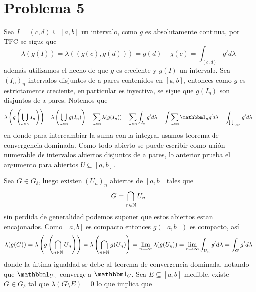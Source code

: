 \documentclass{article}
\begin{document}
\section*{Problema 5}
\noindent Sea $I=(c,d)\subseteq[a,b]$ un intervalo, como $g$ es absolutamente continua, por TFC 
se sigue que
\begin{equation*}
    \lambda(g(I))=\lambda((g(c),g(d)))=g(d)-g(c)=\int_{(c,d)}g'd\lambda
\end{equation*}
además utilizamos el hecho de que $g$ es creciente y $g(I)$ un intervalo.
Sea $(I_{n})_{n}$ intervalos disjuntos de a pares contenidos en $[a,b]$, entonces como $g$ es 
estrictamente creciente, en particular es inyectiva, se sigue que $g(I_{n})$ son disjuntos de a 
pares. Notemos que
\begin{equation*}
    \lambda\left(g\left(\bigcup_{n\in\N}I_{n}\right)\right)
    =\lambda\left(\bigcup_{n\in\N}g(I_{n})\right)=\sum_{n\in\N}\lambda(g(I_{n}))
    =\sum_{n\in\N}\int_{I_{n}}g'd\lambda=\int\sum_{n\in\N}\I_{n}g'd\lambda
    =\int_{\bigcup_{n\in\N}}g'd\lambda
\end{equation*}
en donde para intercambiar la suma con la integral usamos teorema de convergencia dominada. Como
todo abierto se puede escribir como unión numerable de intervalos abiertos disjuntos de a pares,
lo anterior prueba el argumento para abiertos $U\subseteq[a,b]$.

\vspace{2mm}
\noindent Sea $G\in G_{\delta}$, luego existen $(U_{n})_{n}$ abiertos de $[a,b]$ tales que
\begin{equation*}
    G=\bigcap_{n\in\mathbb{N}}U_{n}
\end{equation*}
sin perdida de generalidad podemos suponer que estos abiertos estan encajonados. Como $[a,b]$ es
compacto entonces $g([a,b])$ es compacto, así
\begin{equation*}
    \lambda(g(G))=\lambda\left(g\left(\bigcap_{n\in\mathbb{N}}U_{n}\right)\right)
    =\lambda\left(\bigcap_{n\in\mathbb{N}}g(U_{n})\right)=\lim\limits_{n\to\infty}\lambda(g(U_{n}))
    =\lim\limits_{n\to\infty}\int_{U_{n}}g'd\lambda=\int_{G}g'd\lambda
\end{equation*}
donde la última igualdad se debe al teorema de convergencia dominada, notando que $\I_{U_{n}}$ 
converge a $\I_{G}$. Sea $E\subseteq[a,b]$ medible, existe $G\in G_{\delta}$ tal que 
$\lambda(G\setminus E)=0$ lo que implica que 


\end{document}
